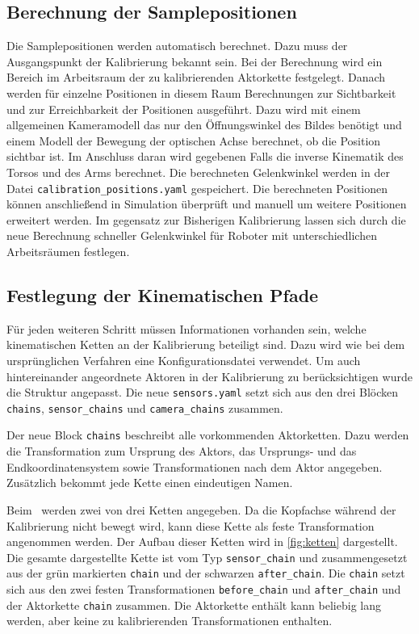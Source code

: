 \subsection{Berechnung der Samplepositionen}
\label{sub:Berechnung der Samplepositionen}
Die Samplepositionen werden automatisch berechnet. Dazu muss der Ausgangspunkt 
der Kalibrierung bekannt sein. Bei der Berechnung wird ein Bereich im Arbeitsraum
der zu kalibrierenden Aktorkette festgelegt. Danach werden für einzelne
Positionen in diesem Raum Berechnungen zur Sichtbarkeit und zur Erreichbarkeit 
der Positionen ausgeführt. Dazu wird mit einem allgemeinen Kameramodell das nur
den Öffnungswinkel des Bildes benötigt und einem Modell der Bewegung der 
optischen Achse berechnet, ob die Position sichtbar ist. Im Anschluss daran wird
gegebenen Falls die inverse Kinematik des Torsos und des Arms berechnet. Die 
berechneten Gelenkwinkel werden in der Datei \texttt{calibration\_positions.yaml}
gespeichert. Die berechneten Positionen können anschließend in Simulation
überprüft und manuell um weitere Positionen erweitert werden. Im gegensatz zur 
Bisherigen Kalibrierung lassen sich durch die neue Berechnung schneller
Gelenkwinkel für Roboter mit unterschiedlichen Arbeitsräumen festlegen. 

\subsection{Festlegung der Kinematischen Pfade}
\label{sub:Festlegung der Kinematischen Pfade}
Für jeden weiteren Schritt müssen Informationen vorhanden sein, welche
kinematischen Ketten an der Kalibrierung beteiligt sind. Dazu wird wie bei dem 
ursprünglichen Verfahren eine Konfigurationsdatei verwendet. Um auch 
hintereinander angeordnete Aktoren in der Kalibrierung zu berücksichtigen wurde 
die Struktur angepasst. Die neue \texttt{sensors.yaml} setzt sich aus den drei
Blöcken \texttt{chains}, \texttt{sensor\_chains} und \texttt{camera\_chains}
zusammen.

Der neue Block \texttt{chains} beschreibt alle vorkommenden Aktorketten. Dazu 
werden die Transformation zum Ursprung des Aktors, das Ursprungs- und das 
Endkoordinatensystem sowie Transformationen nach dem Aktor angegeben. Zusätzlich
bekommt jede Kette einen eindeutigen Namen.

Beim \cob\ werden zwei von drei Ketten angegeben. Da die Kopfachse während der
Kalibrierung nicht bewegt wird, kann diese Kette als feste Transformation 
angenommen werden. Der Aufbau dieser Ketten wird in \ref{fig:ketten}
dargestellt. Die gesamte dargestellte Kette ist vom Typ \texttt{sensor\_chain}
und zusammengesetzt aus der grün markierten \texttt{chain} und der schwarzen 
  \texttt{after\_chain}. Die \texttt{chain} setzt sich aus den zwei festen 
  Transformationen \texttt{before\_chain} und \texttt{after\_chain} und der
  Aktorkette \texttt{chain} zusammen. Die Aktorkette enthält kann beliebig 
  lang werden, aber keine zu kalibrierenden Transformationen enthalten.

